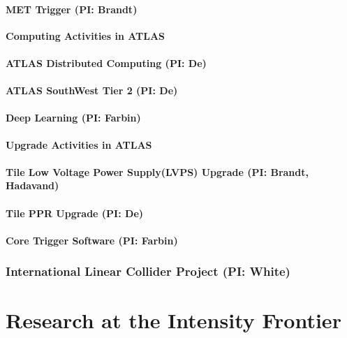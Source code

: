 \documentclass[11pt,english]{article}
\def\overhead#1{\part{#1}}
\def\onehead#1{\section{#1}}
\def\twohead#1{\subsection{#1}}
\def\centerhead#1{
	\begin{center}
	\Large\textbf{#1}
	\end{center}}
\begin{document}
\twohead{MET Trigger (PI: Brandt)}


\centerhead{Computing Activities in ATLAS}


\twohead{ATLAS Distributed Computing (PI: De)}


\twohead{ATLAS SouthWest Tier 2 (PI: De)}


\twohead{Deep Learning (PI: Farbin)}


\centerhead{Upgrade Activities in ATLAS}

\twohead{Tile Low Voltage Power Supply(LVPS) Upgrade  (PI: Brandt, Hadavand)}
\label{sec:Tile-HL-LHC}


\twohead{Tile PPR Upgrade (PI: De)}


\twohead{Core Trigger Software (PI: Farbin)}


\onehead{International Linear Collider Project (PI: White)}









\newpage


\overhead{Research at the Intensity Frontier}


\end{document}
